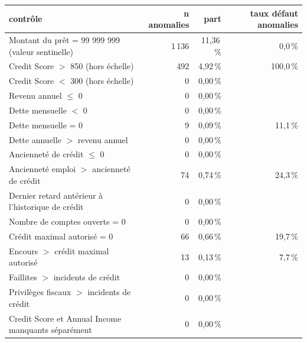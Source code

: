 \begin{tabular}{lrrr}
\toprule
\textbf{contrôle} & \textbf{n anomalies} & \textbf{part} & \textbf{taux défaut anomalies} \\
\midrule
Montant du prêt = 99 999 999 (valeur sentinelle) & 1\,136 & 11,36\,\% & 0,0\,\% \\
Credit Score $>$ 850 (hors échelle) & 492 & 4,92\,\% & 100,0\,\% \\
Credit Score $<$ 300 (hors échelle) & 0 & 0,00\,\% &  \\
Revenu annuel $\leq$ 0 & 0 & 0,00\,\% &  \\
Dette mensuelle $<$ 0 & 0 & 0,00\,\% &  \\
Dette mensuelle = 0 & 9 & 0,09\,\% & 11,1\,\% \\
Dette annuelle $>$ revenu annuel & 0 & 0,00\,\% &  \\
Ancienneté de crédit $\leq$ 0 & 0 & 0,00\,\% &  \\
Ancienneté emploi $>$ ancienneté de crédit & 74 & 0,74\,\% & 24,3\,\% \\
Dernier retard antérieur à l'historique de crédit & 0 & 0,00\,\% &  \\
Nombre de comptes ouverts = 0 & 0 & 0,00\,\% &  \\
Crédit maximal autorisé = 0 & 66 & 0,66\,\% & 19,7\,\% \\
Encours $>$ crédit maximal autorisé & 13 & 0,13\,\% & 7,7\,\% \\
Faillites $>$ incidents de crédit & 0 & 0,00\,\% &  \\
Privilèges fiscaux $>$ incidents de crédit & 0 & 0,00\,\% &  \\
Credit Score et Annual Income manquants séparément & 0 & 0,00\,\% &  \\
\bottomrule
\end{tabular}
